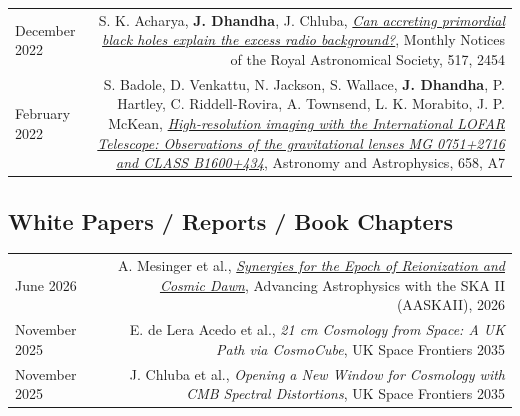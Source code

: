 \documentclass{article}
\begin{document}
\begin{longtable}{L!{\vrule}R}
    December 2022 & S. K. Acharya, \textbf{J. Dhandha}, J. Chluba, \href{https://ui.adsabs.harvard.edu/abs/2022MNRAS.517.2454A}{\textit{Can accreting primordial black holes explain the excess radio background?}}, Monthly Notices of the Royal Astronomical Society, 517, 2454 \\

    February 2022 & S. Badole, D. Venkattu, N. Jackson, S. Wallace, \textbf{J. Dhandha}, P. Hartley, C. Riddell-Rovira, A. Townsend, L. K. Morabito, J. P. McKean, \href{https://ui.adsabs.harvard.edu/abs/2022A&A...658A...7B}{\textit{High-resolution imaging with the International LOFAR Telescope: Observations of the gravitational lenses MG 0751+2716 and CLASS B1600+434}}, Astronomy and Astrophysics, 658, A7 \\
\end{longtable}

\subsection*{White Papers / Reports / Book Chapters}

\begin{longtable}{L!{\vrule}R}
    June 2026 &
    A. Mesinger et al., \href{https://ui.adsabs.harvard.edu/abs/2026arXiv260630947C}{\textit{Synergies for the Epoch of Reionization and Cosmic Dawn}}, Advancing Astrophysics with the SKA II (AASKAII), 2026\\

    November 2025 &
    E. de Lera Acedo et al., \textit{21 cm Cosmology from Space: A UK Path via CosmoCube}, UK Space Frontiers 2035 \\

    November 2025 &
    J. Chluba et al., \textit{Opening a New Window for Cosmology with CMB Spectral Distortions}, UK Space Frontiers 2035 \\
\end{longtable}
\end{document}
